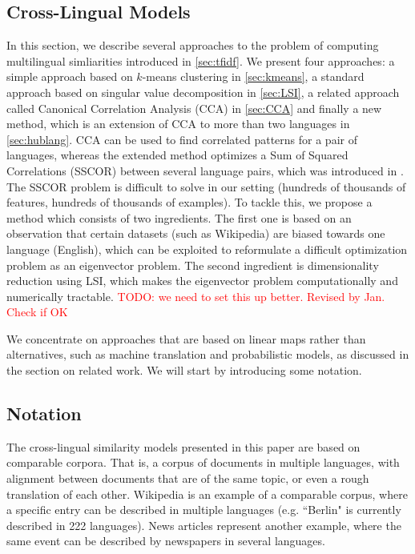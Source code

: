 \documentclass[twoside,11pt]{article}
\newcommand{\todo}[1]{\textcolor{red}{TODO: #1}}
\begin{document}
\subsection{Cross-Lingual Models}\label{sec:models}
In this section, we describe several approaches to the problem of computing multilingual simliarities introduced in \ref{sec:tfidf}. We present four approaches:
a simple approach based on $k$-means clustering in \ref{sec:kmeans}, a standard approach based on singular value decomposition in \ref{sec:LSI}, a related
approach called Canonical Correlation Analysis (CCA) in \ref{sec:CCA} and finally a new method, which is an extension of CCA to more than two languages in \ref{sec:hublang}.
%
CCA can be used to find correlated patterns for a pair of languages, whereas the extended method optimizes a
Sum of Squared Correlations (SSCOR) between several language pairs, which was introduced in \cite{Kettenring}. The SSCOR problem is difficult to solve in our setting (hundreds of thousands of features, hundreds of thousands of examples). To tackle this, we propose a method which consists of two ingredients.
 The first one is based on an observation that certain datasets (such as Wikipedia) are biased towards one language (English), which can be exploited
 to reformulate a difficult optimization problem as an eigenvector problem. The second ingredient is dimensionality reduction using LSI, which
 makes the eigenvector problem computationally and numerically tractable. \todo{we need to set this up better. Revised by Jan. Check if OK}

We concentrate on approaches that are based on linear maps rather than alternatives, such as machine translation and probabilistic models, as discussed in the section on related work.
We will start by introducing some notation.

\subsection{Notation}

The cross-lingual similarity models presented in this paper are based on comparable corpora. That is, a corpus of documents in multiple languages, with alignment between documents that are of the same topic, or even a rough translation of each other. Wikipedia is an example of a comparable corpus, where a specific entry can be described in multiple languages (e.g. ``Berlin" is currently described in 222 languages). News articles represent another example, where the same event can be described by newspapers in several languages.
\end{document}
